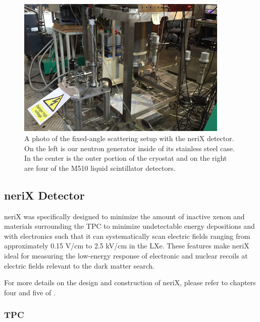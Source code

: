 \begin{figure}[bt]
        \centering
	\includegraphics[width=0.9\textwidth]{nerix_experimental_setup}
	\caption{A photo of the fixed-angle scattering setup with the neriX detector.  On the left is our neutron generator inside of its stainless steel case.  In the center is the outer portion of the cryostat and on the right are four of the M510 liquid scintillator detectors.}
	\label{fig:nerix_experimental_setup}
\end{figure}



\subsection{neriX Detector}

neriX was specifically designed to minimize the amount of inactive xenon and materials surrounding the TPC to minimize undetectable energy depositions and with electronics such that it can systematically scan electric fields ranging from approximately 0.15 V/cm to 2.5 kV/cm in the LXe.  These features make neriX ideal for measuring the low-energy response of electronic and nuclear recoils at electric fields relevant to the dark matter search.

For more details on the design and construction of neriX, please refer to chapters four and five of .

\subsubsection{TPC}

